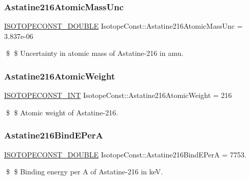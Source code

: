 \subsubsection{\texorpdfstring{Astatine216\+Atomic\+Mass\+Unc}{Astatine216AtomicMassUnc}}
{\footnotesize\ttfamily \mbox{\hyperlink{group___isotope_const-_macros_ga8f45a7272ce02c0b4c65c44636ed719a}{I\+S\+O\+T\+O\+P\+E\+C\+O\+N\+S\+T\+\_\+\+D\+O\+U\+B\+LE}} Isotope\+Const\+::\+Astatine216\+Atomic\+Mass\+Unc = 3.\+837e-\/06}

\$ \$ Uncertainty in atomic mass of Astatine-\/216 in amu. \mbox{\label{group___isotope_const-_astatine-_at216_ga820dce2d86e33c752cd8f70103d332f5}} 
\subsubsection{\texorpdfstring{Astatine216\+Atomic\+Weight}{Astatine216AtomicWeight}}
{\footnotesize\ttfamily \mbox{\hyperlink{group___isotope_const-_macros_ga5f18360b3e99483a35c32d789e62621c}{I\+S\+O\+T\+O\+P\+E\+C\+O\+N\+S\+T\+\_\+\+I\+NT}} Isotope\+Const\+::\+Astatine216\+Atomic\+Weight = 216}

\$ \$ Atomic weight of Astatine-\/216. \mbox{\label{group___isotope_const-_astatine-_at216_gac1b52126792c4284d0cb33eb92225cd7}} 
\subsubsection{\texorpdfstring{Astatine216\+Bind\+E\+PerA}{Astatine216BindEPerA}}
{\footnotesize\ttfamily \mbox{\hyperlink{group___isotope_const-_macros_ga8f45a7272ce02c0b4c65c44636ed719a}{I\+S\+O\+T\+O\+P\+E\+C\+O\+N\+S\+T\+\_\+\+D\+O\+U\+B\+LE}} Isotope\+Const\+::\+Astatine216\+Bind\+E\+PerA = 7753.}

\$ \$ Binding energy per A of Astatine-\/216 in keV. \mbox{\label{group___isotope_const-_astatine-_at216_ga8adc305c27e4cd38aec4f7f3cbb0f933}} 
